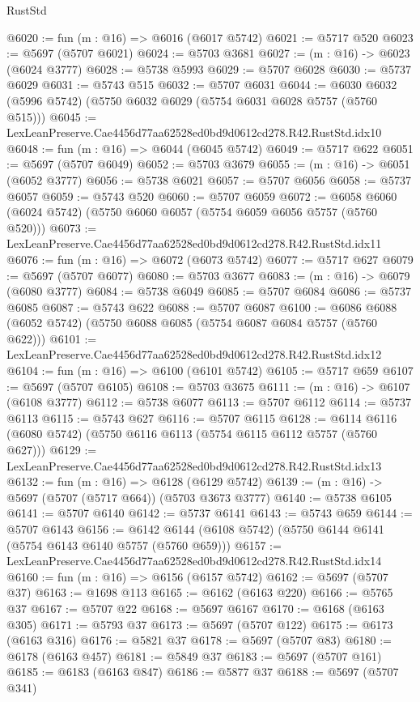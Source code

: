 \begin{lexlean}{RustStd}
\begin{coremodule}
@6020 := fun (m : @16) => @6016 (@6017 @5742)
@6021 := @5717 @520
@6023 := @5697 (@5707 @6021)
@6024 := @5703 @3681
@6027 := (m : @16) -> @6023 (@6024 @3777)
@6028 := @5738 @5993
@6029 := @5707 @6028
@6030 := @5737 @6029
@6031 := @5743 @515
@6032 := @5707 @6031
@6044 := @6030 @6032 (@5996 @5742) (@5750 @6032 @6029 (@5754 @6031 @6028 @5757 (@5760 @515)))
@6045 := LexLeanPreserve.Cae4456d77aa62528ed0bd9d0612cd278.R42.RustStd.idx10
@6048 := fun (m : @16) => @6044 (@6045 @5742)
@6049 := @5717 @622
@6051 := @5697 (@5707 @6049)
@6052 := @5703 @3679
@6055 := (m : @16) -> @6051 (@6052 @3777)
@6056 := @5738 @6021
@6057 := @5707 @6056
@6058 := @5737 @6057
@6059 := @5743 @520
@6060 := @5707 @6059
@6072 := @6058 @6060 (@6024 @5742) (@5750 @6060 @6057 (@5754 @6059 @6056 @5757 (@5760 @520)))
@6073 := LexLeanPreserve.Cae4456d77aa62528ed0bd9d0612cd278.R42.RustStd.idx11
@6076 := fun (m : @16) => @6072 (@6073 @5742)
@6077 := @5717 @627
@6079 := @5697 (@5707 @6077)
@6080 := @5703 @3677
@6083 := (m : @16) -> @6079 (@6080 @3777)
@6084 := @5738 @6049
@6085 := @5707 @6084
@6086 := @5737 @6085
@6087 := @5743 @622
@6088 := @5707 @6087
@6100 := @6086 @6088 (@6052 @5742) (@5750 @6088 @6085 (@5754 @6087 @6084 @5757 (@5760 @622)))
@6101 := LexLeanPreserve.Cae4456d77aa62528ed0bd9d0612cd278.R42.RustStd.idx12
@6104 := fun (m : @16) => @6100 (@6101 @5742)
@6105 := @5717 @659
@6107 := @5697 (@5707 @6105)
@6108 := @5703 @3675
@6111 := (m : @16) -> @6107 (@6108 @3777)
@6112 := @5738 @6077
@6113 := @5707 @6112
@6114 := @5737 @6113
@6115 := @5743 @627
@6116 := @5707 @6115
@6128 := @6114 @6116 (@6080 @5742) (@5750 @6116 @6113 (@5754 @6115 @6112 @5757 (@5760 @627)))
@6129 := LexLeanPreserve.Cae4456d77aa62528ed0bd9d0612cd278.R42.RustStd.idx13
@6132 := fun (m : @16) => @6128 (@6129 @5742)
@6139 := (m : @16) -> @5697 (@5707 (@5717 @664)) (@5703 @3673 @3777)
@6140 := @5738 @6105
@6141 := @5707 @6140
@6142 := @5737 @6141
@6143 := @5743 @659
@6144 := @5707 @6143
@6156 := @6142 @6144 (@6108 @5742) (@5750 @6144 @6141 (@5754 @6143 @6140 @5757 (@5760 @659)))
@6157 := LexLeanPreserve.Cae4456d77aa62528ed0bd9d0612cd278.R42.RustStd.idx14
@6160 := fun (m : @16) => @6156 (@6157 @5742)
@6162 := @5697 (@5707 @37)
@6163 := @1698 @113
@6165 := @6162 (@6163 @220)
@6166 := @5765 @37
@6167 := @5707 @22
@6168 := @5697 @6167
@6170 := @6168 (@6163 @305)
@6171 := @5793 @37
@6173 := @5697 (@5707 @122)
@6175 := @6173 (@6163 @316)
@6176 := @5821 @37
@6178 := @5697 (@5707 @83)
@6180 := @6178 (@6163 @457)
@6181 := @5849 @37
@6183 := @5697 (@5707 @161)
@6185 := @6183 (@6163 @847)
@6186 := @5877 @37
@6188 := @5697 (@5707 @341)

\end{coremodule}
\end{lexlean}
